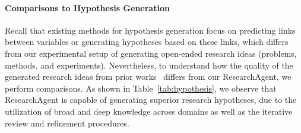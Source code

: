 \documentclass[11pt]{article}
\begin{document}
\begin{table}[t!]
\caption{Comparisons of ResearchAgent with hypothesis generation methods~\cite{CLBD, tomato}.}
\vspace{-0.1in}
\label{tab:hypothesis}
\small
\centering
{}
\vspace{-0.1in}
\end{table}



\paragraph{Comparisons to Hypothesis Generation}
Recall that existing methods for hypothesis generation focus on predicting links between variables or generating hypotheses based on these links, which differs from our experimental setup of generating open-ended research ideas (problems, methods, and experiments). Nevertheless, to understand how the quality of the generated research ideas from prior works~\cite{CLBD, tomato} differs from our ResearchAgent, we perform comparisons. As shown in Table~\ref{tab:hypothesis}, we observe that ResearchAgent is capable of generating superior research hypotheses, due to the utilization of broad and deep knowledge across domains as well as the iterative review and refinement procedures.
\end{document}
